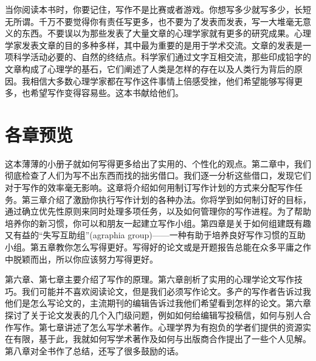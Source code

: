 当你阅读本书时，你要记住，写作不是比赛或者游戏。你想写多少就写多少，长短无所谓。千万不要觉得你有责任写更多，也不要为了发表而发表，写一大堆毫无意义的东西。不要误以为那些发表了大量文章的心理学家就有更多的研究成果。心理学家发表文章的目的多种多样，其中最为重要的是用于学术交流。文章的发表是一项科学活动必要的、自然的终结点。科学家们通过文字互相交流，那些印成铅字的文章构成了心理学的基石，它们阐述了人类是怎样的存在以及人类行为背后的原因。我相信大多数心理学家都在写作这件事情上倍感受挫，他们希望能够写得更多，也希望写作变得容易些。这本书献给他们。


\section{各章预览}
这本薄薄的小册子就如何写得更多给出了实用的、个性化的观点。第二章中，我们彻底检查了人们为写不出东西而找的拙劣借口。我们逐一分析这些借口，发现它们对于写作的效率毫无影响。这章将介绍如何用制订写作计划的方式来分配写作任务。第三章介绍了激励你执行写作计划的各种办法。你将学到如何制订好的目标，通过确立优先性原则来同时处理多项任务，以及如何管理你的写作进程。为了帮助培养你的新习惯，你可以和朋友一起建立写作小组。第四章是关于如何组建既有趣又有益的“失写互助组”(agraphia group)——一种有助于培养良好写作习惯的互助小组。第五章教你怎么写得更好。写得好的论文或是开题报告总能在众多平庸之作中脱颖而出，所以你应该努力写得更好。

第六章、第七章主要介绍了写作的原理。第六章剖析了实用的心理学论文写作技巧。我们可能并不喜欢阅读论文，但是我们必须写作论文。多产的写作者告诉过我他们是怎么写论文的，主流期刊的编辑告诉过我他们希望看到怎样的论文。第六章探讨了关于论文发表的几个入门级问题，例如如何给编辑写投稿信，如何与别人合作写作。第七章讲述了怎么写学术著作。心理学界为有抱负的学者们提供的资源实在有限，基于此，我就如何写学术著作及如何与出版商合作提出了一些个人见解。第八章对全书作了总结，还写了很多鼓励的话。


